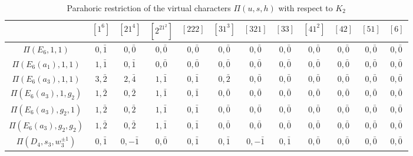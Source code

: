     \begin{table}[ht]
        \centering
        \caption{Parahoric restriction of the virtual characters $\Pi(u,s,h)$ with respect to $K_2$}
        \label{tab:pi_combinations}
        \begin{adjustbox}{max width=\linewidth}
        \begin{tabular}{|c|ccccccccccc|}
        \hline
        & $[1^6]$ & $[21^4]$ & $[2^21^2]$ & $[222]$ & $[31^3]$ & $[321]$ & $[33]$ & $[41^2]$ & $[42]$ & $[51]$ & $[6]$ \\ \hline
        $\Pi(E_6,1,1)$          & $0, \bar{1}$ & $0, \bar{0}$ & $0, \bar{0}$ & $0, \bar{0}$ & $0, \bar{0}$ & $0, \bar{0}$ & $0, \bar{0}$ & $0, \bar{0}$ & $0, \bar{0}$ & $0, \bar{0}$ & $0, \bar{0}$ \\ \hline

        $\Pi(E_6(a_1),1,1)$     & $1, \bar{1}$ & $0, \bar{1}$ & $0, \bar{0}$ & $0, \bar{0}$ & $0, \bar{0}$ & $0, \bar{0}$ & $0, \bar{0}$ & $0, \bar{0}$ & $0, \bar{0}$ & $0, \bar{0}$ & $0, \bar{0}$ \\ \hline

        $\Pi(E_6(a_3),1,1)$     & $3, \bar{2}$ & $2, \bar{4}$ & $1, \bar{1}$ & $0, \bar{1}$ & $0, \bar{2}$ & $0, \bar{0}$ & $0, \bar{0}$ & $0, \bar{0}$ & $0, \bar{0}$ & $0, \bar{0}$ & $0, \bar{0}$ \\ 
        $\Pi(E_6(a_3),1,g_2)$   & $1, \bar{2}$ & $0, \bar{2}$ & $1, \bar{1}$ & $0, \bar{1}$ & $0, \bar{0}$ & $0, \bar{0}$ & $0, \bar{0}$ & $0, \bar{0}$ & $0, \bar{0}$ & $0, \bar{0}$ & $0, \bar{0}$ \\ 
        $\Pi(E_6(a_3),g_2,1)$   & $1, \bar{2}$ & $0, \bar{2}$ & $1, \bar{1}$ & $0, \bar{1}$ & $0, \bar{0}$ & $0, \bar{0}$ & $0, \bar{0}$ & $0, \bar{0}$ & $0, \bar{0}$ & $0, \bar{0}$ & $0, \bar{0}$ \\
        $\Pi(E_6(a_3),g_2,g_2)$ & $1, \bar{2}$ & $0, \bar{2}$ & $1, \bar{1}$ & $0, \bar{1}$ & $0, \bar{0}$ & $0, \bar{0}$ & $0, \bar{0}$ & $0, \bar{0}$ & $0, \bar{0}$ & $0, \bar{0}$ & $0, \bar{0}$ \\ \hline

        $\Pi(D_4,s_3,w_3^{\pm1})$      & $0, \bar{1}$ & $0, -\bar{1}$ & $0, \bar{0}$ & $0, \bar{1}$ & $0, \bar{1}$ & $0, -\bar{1}$ & $0, \bar{1}$ & $0, \bar{0}$ & $0, \bar{0}$ & $0, \bar{0}$ & $0, \bar{0}$ \\\hline


\end{tabular}
\end{adjustbox}
\end{table}
